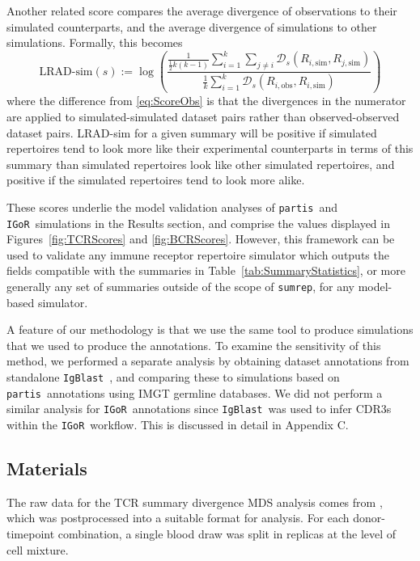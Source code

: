 \documentclass{article}
\newcommand{\partis}{\texttt{partis}}
\newcommand{\igor}{\texttt{IGoR}}
\newcommand{\igblast}{\texttt{IgBlast}}
\begin{document}
Another related score compares the average divergence of observations to their simulated counterparts, and the average divergence of simulations to other simulations.
Formally, this becomes
\begin{equation}\label{eq:ScoreSim}
    \text{LRAD-sim}(s) :=
    \log \left(
        \frac{
            \frac{1}{\frac{1}{2} k\left(k - 1\right)}
            \sum_{i=1}^{k}
            \sum_{j \ne i}
                \mathcal D_s\left(R_{i, \text{sim}}, R_{j, \text{sim}}\right)
        }
        {
            \frac{1}{k}
            \sum_{i = 1}^k
                \mathcal D_s \left( R_{i, \text{obs}}, R_{i, \text{sim}}\right)
        }
    \right)
\end{equation}
where the difference from \eqref{eq:ScoreObs} is that the divergences in the numerator are applied to simulated-simulated dataset pairs rather than observed-observed dataset pairs.
LRAD-sim for a given summary will be positive if simulated repertoires tend to look more like their experimental counterparts in terms of this summary than simulated repertoires look like other simulated repertoires, and positive if the simulated repertoires tend to look more alike.

These scores underlie the model validation analyses of \partis\ and \igor\ simulations in the Results section, and comprise the values displayed in Figures~\ref{fig:TCRScores} and \ref{fig:BCRScores}.
However, this framework can be used to validate any immune receptor repertoire simulator which outputs the fields compatible with the summaries in Table~\ref{tab:SummaryStatistics}, or more generally any set of summaries outside of the scope of \texttt{sumrep}, for any model-based simulator.

A feature of our methodology is that we use the same tool to produce simulations that we used to produce the annotations.
To examine the sensitivity of this method, we performed a separate analysis by obtaining dataset annotations from standalone \igblast~\cite{Ye2013-kl}, and comparing these to simulations based on \partis\ annotations using IMGT germline databases.
We did not perform a similar analysis for \igor\ annotations since \igblast\ was used to infer CDR3s within the \igor\ workflow.
This is discussed in detail in Appendix C.


\subsection*{Materials}
The raw data for the TCR summary divergence MDS analysis comes from \cite{Pogorelyy2018-ak}, which was postprocessed into a suitable format for analysis.
For each donor-timepoint combination, a single blood draw was split in replicas at the level of cell mixture.
\end{document}
